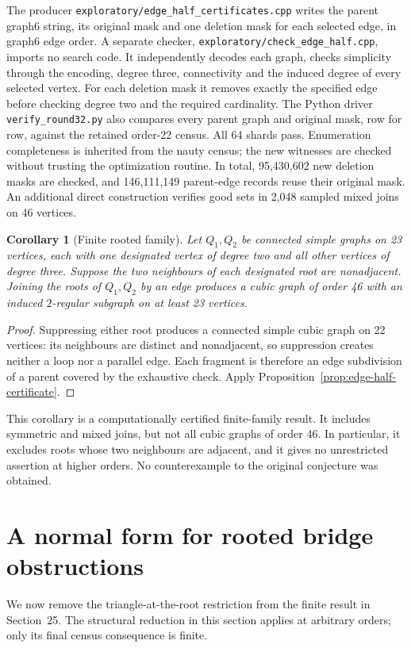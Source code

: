 \documentclass[11pt]{article}
\newtheorem{corollary}[theorem]{Corollary}
\begin{document}
The producer \texttt{exploratory/edge\_half\_certificates.cpp}
writes the parent graph6 string, its original mask and one deletion
mask for each selected edge, in graph6 edge order. A separate checker,
\texttt{exploratory/check\_edge\_half.cpp}, imports no search code.
It independently decodes each graph, checks simplicity through the
encoding, degree three, connectivity and the induced degree of every
selected vertex. For each deletion mask it removes exactly the
specified edge before checking degree two and the required cardinality.
The Python driver \texttt{verify\_round32.py} also compares every
parent graph and original mask, row for row, against the retained
order-22 census. All 64 shards pass. Enumeration completeness is
inherited from the nauty census; the new witnesses are checked
without trusting the optimization routine. In total, 95,430,602 new
deletion masks are checked, and 146,111,149 parent-edge records reuse
their original mask. An additional direct construction verifies good
sets in 2,048 sampled mixed joins on 46 vertices.

\begin{corollary}[Finite rooted family]\label{cor:rooted23}
Let $Q_1,Q_2$ be connected simple graphs on 23 vertices, each with
one designated vertex of degree two and all other vertices of
degree three. Suppose the two neighbours of each designated root
are nonadjacent. Joining the roots of $Q_1,Q_2$ by an edge produces
a cubic graph of order 46 with an induced $2$-regular subgraph on
at least 23 vertices.
\end{corollary}
\begin{proof}
Suppressing either root produces a connected simple cubic graph
on 22 vertices: its neighbours are distinct and nonadjacent, so
suppression creates neither a loop nor a parallel edge. Each
fragment is therefore an edge subdivision of a parent covered by
the exhaustive check. Apply Proposition~\ref{prop:edge-half-certificate}.
\end{proof}

This corollary is a computationally certified finite-family result.
It includes symmetric and mixed joins, but not all cubic graphs of
order 46. In particular, it excludes roots whose two neighbours
are adjacent, and it gives no unrestricted assertion at higher
orders. No counterexample to the original conjecture was obtained.

\section{A normal form for rooted bridge obstructions}
We now remove the triangle-at-the-root restriction from the finite
result in Section~25. The structural reduction in this section applies
at arbitrary orders; only its final census consequence is finite.
\end{document}
